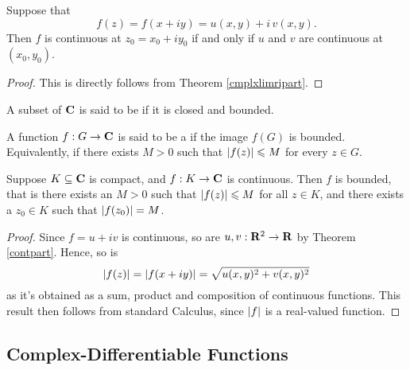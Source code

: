 \medskip

\begin{theorem}\label{contpart}
Suppose that 
\[f(z) = f(x + iy) = u(x,y) + i\,v(x,y).\]
Then $f$ is continuous at $z_0 = x_0 + iy_0$ if and only if $u$ and $v$ are continuous at $(x_0,y_0)$.
\end{theorem}
\begin{proof}
This is directly follows from Theorem \ref{cmplxlimripart}.
\end{proof}

\medskip

\begin{definition}
A subset of $\mathbf C$ is said to be  if it is closed and bounded.
\end{definition}

\medskip

\begin{definition}
A function $f: G \to \mathbf C$ is said to be a  if the image $f(G)$ is bounded. Equivalently, if there exists $M > 0$ such that $\left\lvert f(z)\right\rvert \leqslant M$ for every $z \in G$.
\end{definition}

\medskip

\begin{theorem}\label{evt}
Suppose $K \subseteq \mathbf C$ is compact, and $f: K \to \mathbf C$ is continuous. Then $f$ is bounded, that is there exists an $M > 0$ such that $\left\lvert f(z)\right\rvert \leqslant M$ for all $z \in K$, and there exists a $z_0 \in K$ such that $\left\lvert f(z_0)\right\rvert = M$.
\end{theorem}
\begin{proof}
Since $f = u + iv$ is continuous, so are $u,v:\mathbf R^2 \to \mathbf R$ by Theorem \ref{contpart}.  Hence, so is
\[\left\lvert f(z)\right\rvert = \left\lvert f(x + iy)\right\rvert = \sqrt{u(x,y)^2 + v(x,y)^2}\]
as it's obtained as a sum, product and composition of continuous functions. This result then follows from standard Calculus, since $\left\lvert f\right\rvert$ is a real-valued function.
\end{proof}

\bigskip

\subsection{Complex-Differentiable Functions}

